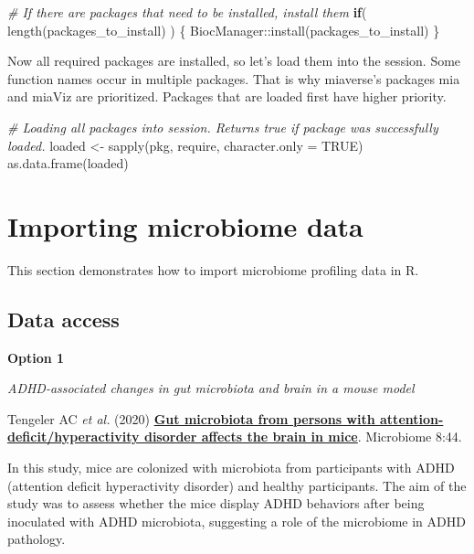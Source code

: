\documentclass[
  oneside]{book}
\newenvironment{Shaded}{\begin{snugshade}}{\end{snugshade}}
\newcommand{\AttributeTok}[1]{\textcolor[rgb]{0.77,0.63,0.00}{#1}}
\newcommand{\CommentTok}[1]{\textcolor[rgb]{0.56,0.35,0.01}{\textit{#1}}}
\newcommand{\ConstantTok}[1]{\textcolor[rgb]{0.00,0.00,0.00}{#1}}
\newcommand{\ControlFlowTok}[1]{\textcolor[rgb]{0.13,0.29,0.53}{\textbf{#1}}}
\newcommand{\FunctionTok}[1]{\textcolor[rgb]{0.00,0.00,0.00}{#1}}
\newcommand{\NormalTok}[1]{#1}
\newcommand{\OtherTok}[1]{\textcolor[rgb]{0.56,0.35,0.01}{#1}}
\newcommand{\SpecialCharTok}[1]{\textcolor[rgb]{0.00,0.00,0.00}{#1}}
\begin{document}
\begin{Shaded}
\begin{Highlighting}[]
\CommentTok{\# If there are packages that need to be installed, install them }
\ControlFlowTok{if}\NormalTok{( }\FunctionTok{length}\NormalTok{(packages\_to\_install) ) \{}
\NormalTok{   BiocManager}\SpecialCharTok{::}\FunctionTok{install}\NormalTok{(packages\_to\_install)}
\NormalTok{\}}
\end{Highlighting}
\end{Shaded}

Now all required packages are installed, so let's load them into the session.
Some function names occur in multiple packages. That is why miaverse's packages
mia and miaViz are prioritized. Packages that are loaded first have higher priority.

\begin{Shaded}
\begin{Highlighting}[]
\CommentTok{\# Loading all packages into session. Returns true if package was successfully loaded.}
\NormalTok{loaded }\OtherTok{\textless{}{-}} \FunctionTok{sapply}\NormalTok{(pkg, require, }\AttributeTok{character.only =} \ConstantTok{TRUE}\NormalTok{)}
\FunctionTok{as.data.frame}\NormalTok{(loaded)}
\end{Highlighting}
\end{Shaded}

\hypertarget{importing-microbiome-data}{%
\chapter{Importing microbiome data}\label{importing-microbiome-data}}

This section demonstrates how to import microbiome profiling data in R.

\hypertarget{data-access}{%
\section{Data access}\label{data-access}}

\textbf{Option 1}

\emph{ADHD-associated changes in gut microbiota and brain in a mouse model}

Tengeler AC \emph{et
al.} (2020) \href{https://doi.org/10.1186/s40168-020-00816-x}{\textbf{Gut microbiota from persons with
attention-deficit/hyperactivity disorder affects the brain in
mice}}. Microbiome
8:44.

In this study, mice are colonized with microbiota from participants
with ADHD (attention deficit hyperactivity disorder) and healthy
participants. The aim of the study was to assess whether the mice
display ADHD behaviors after being inoculated with ADHD microbiota,
suggesting a role of the microbiome in ADHD pathology.
\end{document}
